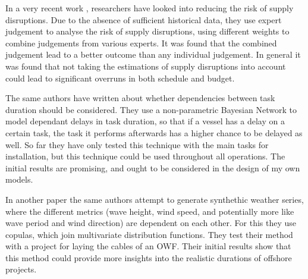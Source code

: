 \documentclass[a4paper,12pt]{article}
\begin{document}
\bigskip

In a very recent work \cite{leontaris2019decision}, researchers have looked into reducing the risk of supply disruptions. Due to the absence of sufficient historical data, they use expert judgement to analyse the risk of supply disruptions, using different weights to combine judgements from various experts. It was found that the combined judgement lead to a better outcome than any individual judgement. In general it was found that not taking the estimations of supply disruptions into account could lead to significant overruns in both schedule and budget. 

The same authors have written about whether dependencies between task duration \cite{leontaris2018probabilistic} should be considered. They use a non-parametric Bayesian Network to model dependant delays in task duration, so that if a vessel has a delay on a certain task, the task it performs afterwards has a higher chance to be delayed as well. So far they have only tested this technique with the main tasks for installation, but this technique could be used throughout all operations. The initial results are promising, and ought to be considered in the design of my own models. 

In another paper \cite{leontaris2016probabilistic} the same authors attempt to generate synthethic weather series, where the different metrics (wave height, wind speed, and potentially more like wave period and wind direction) are dependent on each other. For this they use copulas, which join multivariate distribution functions. They test their method with a project for laying the cables of an OWF. Their initial results show that this method could provide more insights into the realistic durations of offshore projects. 

\bigskip
\end{document}
